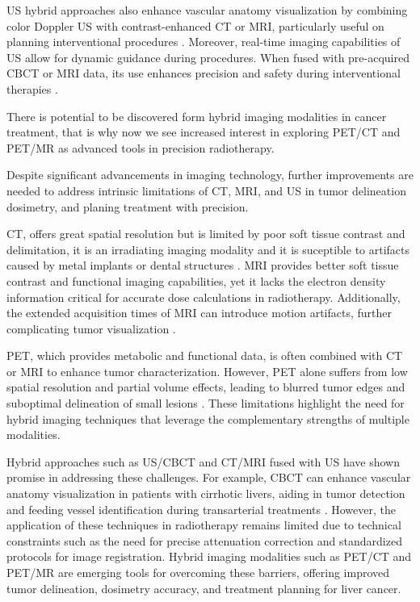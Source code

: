 \documentclass[11pt]{article} %
\begin{document}
\begin{multicols}{2}
US hybrid approaches also enhance vascular anatomy visualization by combining color Doppler US with contrast-enhanced CT or MRI, particularly useful on planning interventional procedures \cite{frontiers2022}. Moreover, real-time imaging capabilities of US allow for dynamic guidance during procedures. When fused with pre-acquired CBCT or MRI data, its use enhances precision and safety during interventional therapies \cite{rsna2021}.

There is potential to be discovered form hybrid imaging modalities in cancer treatment, that is why now we see increased interest in exploring PET/CT and PET/MR as advanced tools in precision radiotherapy.

Despite significant advancements in imaging technology, further improvements are needed to address intrinsic limitations of CT, MRI, and US in tumor delineation dosimetry, and planing treatment with precision.

CT, offers great spatial resolution but is limited by poor soft tissue contrast and delimitation, it is an irradiating imaging modality and it is suceptible to artifacts caused by metal implants or dental structures \cite{decazes2021}. MRI provides better soft tissue contrast and functional imaging capabilities, yet it lacks the electron density information critical for accurate dose calculations in radiotherapy. Additionally, the extended acquisition times of MRI can introduce motion artifacts, further complicating tumor visualization \cite{floridi2022}.

PET, which provides metabolic and functional data, is often combined with CT or MRI to enhance tumor characterization. However, PET alone suffers from low spatial resolution and partial volume effects, leading to blurred tumor edges and suboptimal delineation of small lesions \cite{yan2024}. These limitations highlight the need for hybrid imaging techniques that leverage the complementary strengths of multiple modalities.

Hybrid approaches such as US/CBCT and CT/MRI fused with US have shown promise in addressing these challenges. For example, CBCT can enhance vascular anatomy visualization in patients with cirrhotic livers, aiding in tumor detection and feeding vessel identification during transarterial treatments \cite{floridi2022}. However, the application of these techniques in radiotherapy remains limited due to technical constraints such as the need for precise attenuation correction and standardized protocols for image registration. Hybrid imaging modalities such as PET/CT and PET/MR are emerging tools for overcoming these barriers, offering improved tumor delineation, dosimetry accuracy, and treatment planning for liver cancer. \cite{knesaurek2018,zhou2021}



\end{multicols}
\end{document}
